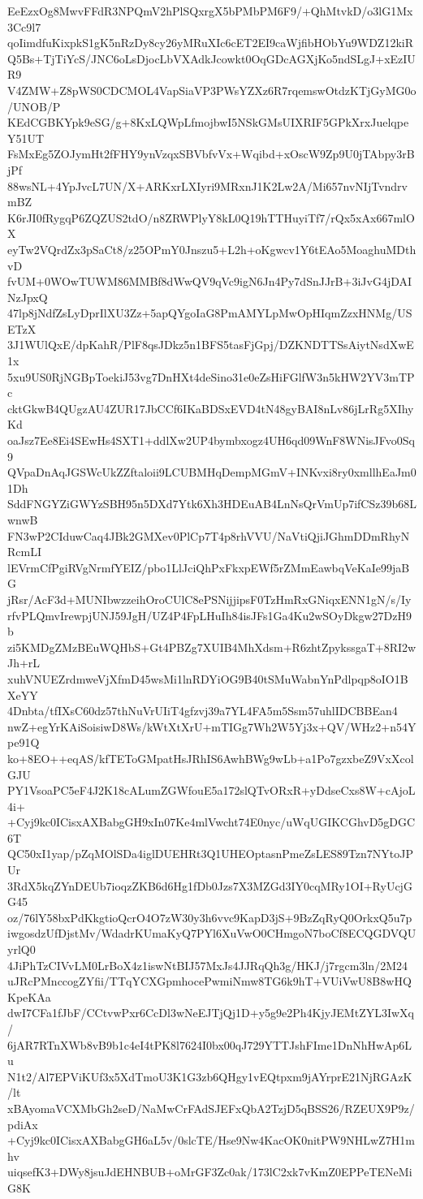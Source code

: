 EeEzxOg8MwvFFdR3NPQmV2hPlSQxrgX5bPMbPM6F9/+QhMtvkD/o3lG1Mx3Cc9l7
qoIimdfuKixpkS1gK5nRzDy8cy26yMRuXIc6cET2EI9caWjfibHObYu9WDZ12kiR
Q5Bs+TjTiYcS/JNC6oLsDjocLbVXAdkJcowkt0OqGDcAGXjKo5ndSLgJ+xEzIUR9
V4ZMW+Z8pWS0CDCMOL4VapSiaVP3PWsYZXz6R7rqemswOtdzKTjGyMG0o/UNOB/P
KEdCGBKYpk9eSG/g+8KxLQWpLfmojbwI5NSkGMsUIXRIF5GPkXrxJuelqpeY51UT
FsMxEg5ZOJymHt2fFHY9ynVzqxSBVbfvVx+Wqibd+xOscW9Zp9U0jTAbpy3rBjPf
88wsNL+4YpJvcL7UN/X+ARKxrLXIyri9MRxnJ1K2Lw2A/Mi657nvNIjTvndrvmBZ
K6rJI0fRygqP6ZQZUS2tdO/n8ZRWPlyY8kL0Q19hTTHuyiTf7/rQx5xAx667mlOX
eyTw2VQrdZx3pSaCt8/z25OPmY0Jnszu5+L2h+oKgwcv1Y6tEAo5MoaghuMDthvD
fvUM+0WOwTUWM86MMBf8dWwQV9qVc9igN6Jn4Py7dSnJJrB+3iJvG4jDAINzJpxQ
47lp8jNdfZsLyDprIlXU3Zz+5apQYgoIaG8PmAMYLpMwOpHIqmZzxHNMg/USETzX
3J1WUlQxE/dpKahR/PlF8qsJDkz5n1BFS5tasFjGpj/DZKNDTTSsAiytNsdXwE1x
5xu9US0RjNGBpToekiJ53vg7DnHXt4deSino31e0eZsHiFGlfW3n5kHW2YV3mTPc
cktGkwB4QUgzAU4ZUR17JbCCf6IKaBDSxEVD4tN48gyBAI8nLv86jLrRg5XIhyKd
oaJsz7Ee8Ei4SEwHs4SXT1+ddlXw2UP4bymbxogz4UH6qd09WnF8WNisJFvo0Sq9
QVpaDnAqJGSWcUkZZftaloii9LCUBMHqDempMGmV+INKvxi8ry0xmllhEaJm01Dh
SddFNGYZiGWYzSBH95n5DXd7Ytk6Xh3HDEuAB4LnNsQrVmUp7ifCSz39b68LwnwB
FN3wP2CIduwCaq4JBk2GMXev0PlCp7T4p8rhVVU/NaVtiQjiJGhmDDmRhyNRcmLI
lEVrmCfPgiRVgNrmfYEIZ/pbo1LlJciQhPxFkxpEWf5rZMmEawbqVeKaIe99jaBG
jRsr/AcF3d+MUNIbwzzeihOroCUlC8ePSNijjipsF0TzHmRxGNiqxENN1gN/s/Iy
rfvPLQmvIrewpjUNJ59JgH/UZ4P4FpLHuIh84isJFs1Ga4Ku2wSOyDkgw27DzH9b
zi5KMDgZMzBEuWQHbS+Gt4PBZg7XUIB4MhXdsm+R6zhtZpykssgaT+8RI2wJh+rL
xuhVNUEZrdmweVjXfmD45wsMi1lnRDYiOG9B40tSMuWabnYnPdlpqp8oIO1BXeYY
4Dnbta/tfIXsC60dz57thNuVrUIiT4gfzvj39a7YL4FA5m5Ssm57uhlIDCBBEan4
nwZ+egYrKAiSoisiwD8Ws/kWtXtXrU+mTIGg7Wh2W5Yj3x+QV/WHz2+n54Ype91Q
ko+8EO++eqAS/kfTEToGMpatHsJRhIS6AwhBWg9wLb+a1Po7gzxbeZ9VxXcolGJU
PY1VsoaPC5eF4J2K18cALumZGWfouE5a172slQTvORxR+yDdseCxs8W+cAjoL4i+
+Cyj9kc0ICisxAXBabgGH9xIn07Ke4mlVwcht74E0nyc/uWqUGIKCGhvD5gDGC6T
QC50xI1yap/pZqMOlSDa4iglDUEHRt3Q1UHEOptasnPmeZsLES89Tzn7NYtoJPUr
3RdX5kqZYnDEUb7ioqzZKB6d6Hg1fDb0Jzs7X3MZGd3IY0cqMRy1OI+RyUcjGG45
oz/76lY58bxPdKkgtioQcrO4O7zW30y3h6vvc9KapD3jS+9BzZqRyQ0OrkxQ5u7p
iwgosdzUfDjstMv/WdadrKUmaKyQ7PYl6XuVwO0CHmgoN7boCf8ECQGDVQUyrlQ0
4JiPhTzCIVvLM0LrBoX4z1iswNtBIJ57MxJs4JJRqQh3g/HKJ/j7rgcm3ln/2M24
uJRcPMnccogZYfii/TTqYCXGpmhocePwmiNmw8TG6k9hT+VUiVwU8B8wHQKpeKAa
dwI7CFa1fJbF/CCtvwPxr6CcDl3wNeEJTjQj1D+y5g9e2Ph4KjyJEMtZYL3IwXq/
6jAR7RTnXWb8vB9b1c4eI4tPK8l7624I0bx00qJ729YTTJshFIme1DnNhHwAp6Lu
N1t2/Al7EPViKUf3x5XdTmoU3K1G3zb6QHgy1vEQtpxm9jAYrprE21NjRGAzK/lt
xBAyomaVCXMbGh2seD/NaMwCrFAdSJEFxQbA2TzjD5qBSS26/RZEUX9P9z/pdiAx
+Cyj9kc0ICisxAXBabgGH6aL5v/0slcTE/Hse9Nw4KacOK0nitPW9NHLwZ7H1mhv
uiqsefK3+DWy8jsuJdEHNBUB+oMrGF3Zc0ak/173lC2xk7vKmZ0EPPeTENeMiG8K
